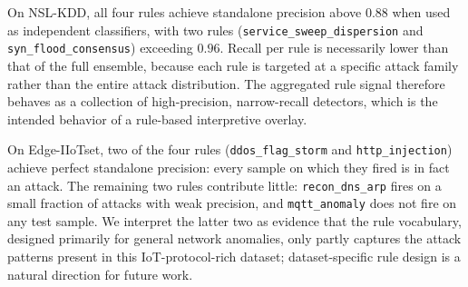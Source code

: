 \documentclass[pdflatex,sn-mathphys-num]{sn-jnl}
\theoremstyle{thmstyleone}
\theoremstyle{thmstyletwo}
\theoremstyle{thmstylethree}
\begin{document}
\begin{table}[!ht]
\centering
\caption{Per-Rule Global Statistics on the Test Sets (seed $42$, firing threshold $0.55$)}\label{tab:rules}
\end{table}

On NSL-KDD, all four rules achieve standalone precision above $0.88$ when used as independent classifiers, with two rules (\texttt{service\_sweep\_dispersion} and \texttt{syn\_flood\_consensus}) exceeding $0.96$. Recall per rule is necessarily lower than that of the full ensemble, because each rule is targeted at a specific attack family rather than the entire attack distribution. The aggregated rule signal therefore behaves as a collection of high-precision, narrow-recall detectors, which is the intended behavior of a rule-based interpretive overlay.

On Edge-IIoTset, two of the four rules (\texttt{ddos\_flag\_storm} and \texttt{http\_injection}) achieve perfect standalone precision: every sample on which they fired is in fact an attack. The remaining two rules contribute little: \texttt{recon\_dns\_arp} fires on a small fraction of attacks with weak precision, and \texttt{mqtt\_anomaly} does not fire on any test sample. We interpret the latter two as evidence that the rule vocabulary, designed primarily for general network anomalies, only partly captures the attack patterns present in this IoT-protocol-rich dataset; dataset-specific rule design is a natural direction for future work.
\end{document}

